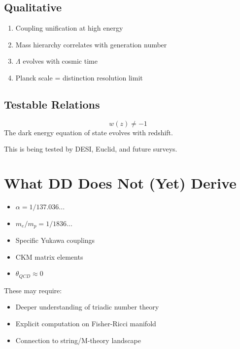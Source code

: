 \subsection{Qualitative}

\begin{enumerate}
    \item Coupling unification at high energy
    \item Mass hierarchy correlates with generation number
    \item $\Lambda$ evolves with cosmic time
    \item Planck scale = distinction resolution limit
\end{enumerate}

\subsection{Testable Relations}

\begin{theorem}
\begin{equation}
w(z) \neq -1
\end{equation}
The dark energy equation of state evolves with redshift.
\end{theorem}

This is being tested by DESI, Euclid, and future surveys.

\section{What DD Does Not (Yet) Derive}

\begin{itemize}
    \item $\alpha = 1/137.036...$
    \item $m_e/m_p = 1/1836...$
    \item Specific Yukawa couplings
    \item CKM matrix elements
    \item $\theta_{QCD} \approx 0$
\end{itemize}

These may require:
\begin{itemize}
    \item Deeper understanding of triadic number theory
    \item Explicit computation on Fisher-Ricci manifold
    \item Connection to string/M-theory landscape
\end{itemize}

